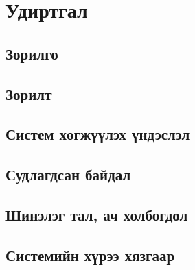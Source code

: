 \section*{Удиртгал}
\subsection*{Зорилго}
\subsection*{Зорилт}
\subsection*{Систем хөгжүүлэх үндэслэл}
\subsection*{Судлагдсан байдал}
\subsection*{Шинэлэг тал, ач холбогдол}
\subsection*{Системийн хүрээ хязгаар}
